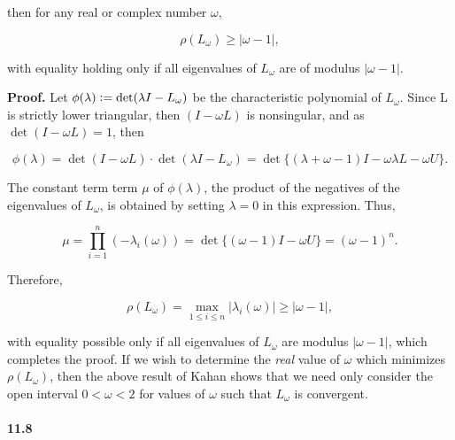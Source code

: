 \documentclass[a4paper, 11pt]{article}
\begin{document}
	
	then for any real or complex number $\omega$,
	
	\[
	\rho(L_{\omega})\ge|\omega-1|,
	\]
	
	
	with equality holding only if all eigenvalues of $L_{\omega}$ are
	of modulus $|\omega-1|$.
	
	\textbf{Proof.} Let $\phi(\lambda)\mathrel{\mathop:}=\det(\lambda I-L_{\omega})$ be
	the characteristic polynomial of $L_{\omega}$. Since L is strictly
	lower triangular, then $(I-\omega L)$ is nonsingular, and as $\det(I-\omega L)=1$,
	then
	
	\[
	\phi(\lambda)=\det(I-\omega L)\cdot\det(\lambda I-L_{\omega})=\det\{(\lambda+\omega-1)I-\omega\lambda L-\omega U\}.
	\]
	
	
	The constant term term $\mu$ of $\phi(\lambda)$, the product of
	the negatives of the eigenvalues of $L_{\omega}$, is obtained by
	setting $\lambda=0$ in this expression. Thus,
	
	\[
	\mu=\prod_{i=1}^{n}(-\lambda_{i}(\omega))=\det\{(\omega-1)I-\omega U\}=(\omega-1)^{n}.
	\]
	
	
	Therefore,
	
	\[
	\rho(L_{\omega})=\max_{1\le i\le n}|\lambda_{i}(\omega)|\ge|\omega-1|,
	\]
	
	
	with equality possible only if all eigenvalues of $L_{\omega}$ are
	modulus $|\omega-1|$, which completes the proof. If we wish to determine
	the \emph{real} value of $\omega$ which minimizes $\rho(L_{\omega})$,
	then the above result of Kahan shows that we need only consider the
	open interval $0<\omega<2$ for values of $\omega$ such that $L_{\omega}$
	is convergent.
	
	
	\paragraph{11.8}
	
\end{document}
